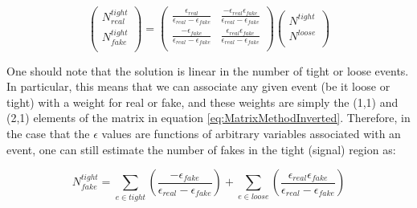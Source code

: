 \begin{equation}
\begin{pmatrix} N^{tight}_{real} \\ N^{tight}_{fake} \\ \end{pmatrix} 
  = 
  \begin{pmatrix} 
    \frac{\epsilon_{real}}{\epsilon_{real} - \epsilon_{fake}} & \frac{-\epsilon_{real}\epsilon_{fake}}{\epsilon_{real} - \epsilon_{fake}} \\ 
    \frac{-\epsilon_{fake}}{\epsilon_{real} - \epsilon_{fake}} & \frac{\epsilon_{real}\epsilon_{fake}}{\epsilon_{real} - \epsilon_{fake}} \\ 
  \end{pmatrix}  
  \begin{pmatrix} N^{tight} \\ N^{loose} \\ \end{pmatrix}
  \label{eq:MatrixMethodInverted}
\end{equation}

One should note that the solution is linear in the number of tight or loose events.
In particular, this means that we can associate any given event (be it loose or tight) with a weight for real or fake, and these weights are simply the (1,1) and (2,1) elements of the matrix in equation \ref{eq:MatrixMethodInverted}.
Therefore, in the case that the $\epsilon$ values are functions of arbitrary variables associated with an event, one can still estimate the number of fakes in the tight (signal) region as:

\begin{equation}
  N^{tight}_{fake} = \sum_{e \in tight} (\frac{-\epsilon_{fake}}{\epsilon_{real} - \epsilon_{fake}}) + \sum_{e \in loose} (\frac{\epsilon_{real}\epsilon_{fake}}{\epsilon_{real} - \epsilon_{fake}})
  \label{eq:MatrixMethodSum}
\end{equation}

